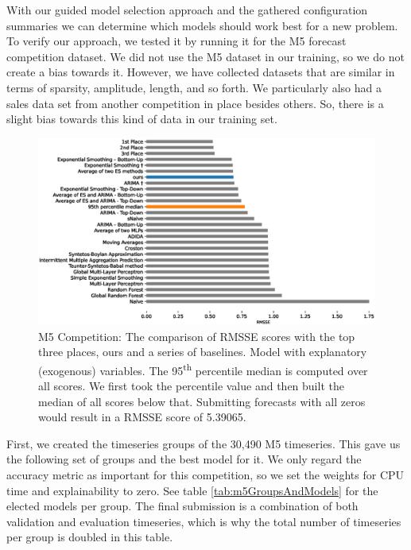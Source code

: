 With our guided model selection approach and the gathered configuration summaries we can determine which models should work best for a new problem. To verify our approach, we tested it by running it for the M5 forecast competition dataset. We did not use the M5 dataset in our training, so we do not create a bias towards it. However, we have collected datasets that are similar in terms of sparsity, amplitude, length, and so forth. We particularly also had a sales data set from another competition in place besides others. So, there is a slight bias towards this kind of data in our training set.


\begin{figure}
\centerline{\includegraphics[scale=.6]{Figures/m5-leaderboard.eps}}
\caption{M5 Competition: The comparison of RMSSE scores with the top three places, ours and a series of baselines. \textdagger Model with explanatory (exogenous) variables. The 95\textsuperscript{th} percentile median is computed over all scores. We first took the percentile value and then built the median of all scores below that. Submitting forecasts with all zeros would result in a RMSSE score of 5.39065.}
\label{fig:m5-leaderboard}
\end{figure}

First, we created the timeseries groups of the 30,490 M5 timeseries. This gave us the following set of groups and the best model for it. We only regard the accuracy metric as important for this competition, so we set the weights for CPU time and explainability to zero. See table \ref{tab:m5GroupsAndModels} for the elected models per group. The final submission is a combination of both validation and evaluation timeseries, which is why the total number of timeseries per group is doubled in this table.

